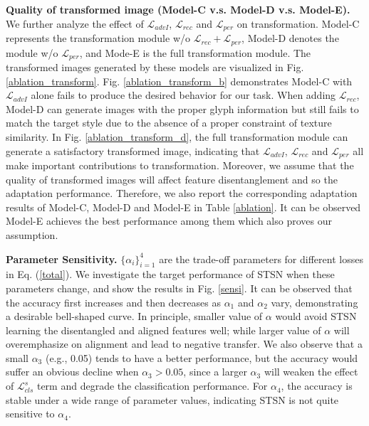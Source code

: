 \documentclass[10pt,journal,compsoc,twocolumn ]{IEEEtran}
\begin{document}
\textbf{Quality of transformed image (Model-C v.s. Model-D v.s. Model-E).} We further analyze the effect of $\mathcal{L}_{advI}$, $\mathcal{L}_{rec}$ and $\mathcal{L}_{per}$ on transformation. Model-C represents the transformation module w/o $\mathcal{L}_{rec}+\mathcal{L}_{per}$, Model-D denotes the module w/o $\mathcal{L}_{per}$, and Mode-E is the full transformation module. The transformed images generated by these models are visualized in Fig. \ref{ablation_transform}. Fig. \ref{ablation_transform_b} demonstrates Model-C with $\mathcal{L}_{advI}$ alone fails to produce the desired behavior for our task. When adding $\mathcal{L}_{rec}$, Model-D can generate images with the proper glyph information but still fails to match the target style due to the absence of a proper constraint of texture similarity. In Fig. \ref{ablation_transform_d}, the full transformation module can generate a satisfactory transformed image, indicating that $\mathcal{L}_{advI}$, $\mathcal{L}_{rec}$ and $\mathcal{L}_{per}$ all make important contributions to transformation. Moreover, we assume that the quality of transformed images will affect feature disentanglement and so the adaptation performance. Therefore, we also report the corresponding adaptation results of Model-C, Model-D and Model-E in Table \ref{ablation}. It can be observed Model-E achieves the best performance among them which also proves our assumption. %

\textbf{Parameter Sensitivity.} $\{\alpha_i\}_{i=1}^4$ are the trade-off parameters for different losses in Eq. (\ref{total}). We investigate the target performance of STSN when these parameters change, and show the results in Fig. \ref{sensi}. It can be observed that the accuracy first increases and then decreases as $\alpha_1$ and $\alpha_2$ vary, demonstrating a desirable bell-shaped curve. In principle, smaller value of $\alpha$ would avoid STSN learning the disentangled and aligned features well; while larger value of $\alpha$ will overemphasize on alignment and lead to negative transfer. We also observe that a small $\alpha_3$ (e.g., 0.05) tends to have a better performance, but the accuracy would suffer an obvious decline when $\alpha_3>0.05$, since a larger $\alpha_3$ will weaken the effect of $\mathcal{L}_{cls}^{s}$ term and degrade the classification performance. For $\alpha_4$, the accuracy is stable under a wide range of parameter values, indicating STSN is not quite sensitive to $\alpha_4$.
\end{document}
